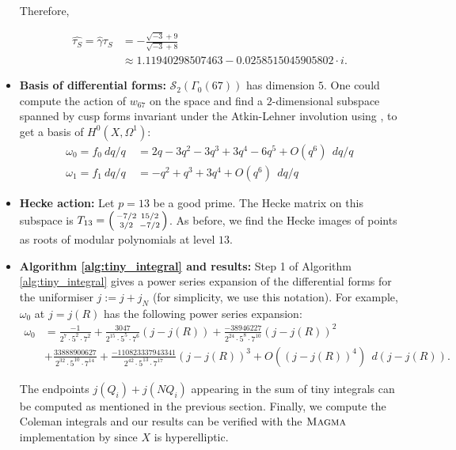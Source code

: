 \begin{itemize}
Therefore,

\begin{align*}
\hat{\tau_S} = \hat{\gamma}\tau_S &=  -\frac{\sqrt{-3} + 9}{\sqrt{-3} + 8} \\ &\approx 1.11940298507463 - 0.0258515045905802\cdot i.
\end{align*}


\item \textbf{Basis of differential forms:} $\mathcal{S}_2(\Gamma_0(67))$ has dimension $5$. One could compute the action of $w_{67}$ on the space and find a $2$-dimensional subspace spanned by cusp forms invariant under the Atkin-Lehner involution using \SageMath, to get a basis of $H^0(X,\Omega^1)$: \begin{align*} \omega_0 = f_0 \  dq/q \  &= 2q -3q^2 - 3q^3 + 3q^4 - 6q^5 + O(q^6) \ \ dq/q\\ \omega_1 = f_1 \  dq/q \ &= -q^2 + q^3 + 3q^4 + O(q^6) \ \ dq/q
\end{align*}


\item \textbf{Hecke action:} Let $p=13$ be a good prime. The Hecke matrix on this subspace is $T_{13}= \begin{psmallmatrix}
    -7/2 & 15/2 \\ 3/2 & -7/2
\end{psmallmatrix}$. As before, we find the Hecke images of points as roots of modular polynomials at level $13$.

\item \textbf{Algorithm \ref{alg:tiny_integral} and results:} Step 1 of Algorithm \ref{alg:tiny_integral} gives a power series expansion of the differential forms for the uniformiser $j := j + j_N$ (for simplicity, we use this notation). For example, $\omega_0$ at $j=j(R)$ has the following power series expansion:\begin{align*}
    \omega_0 &= \frac{-1}{2^7 \cdot 5^2 \cdot 7^2
} +  \frac{3047}{2^{15} \cdot 5^5 \cdot 7^6
}(j-j(R)) +  \frac{-38946227}{2^{24} \cdot 5^8 \cdot 7^{10}
}(j-j(R))^2 \\ &+ \frac{33888900627}{2^{32} \cdot 5^{10} \cdot 7^{14}
} + \frac{-110823337943341}{2^{42} \cdot 5^{13} \cdot 7^{17}
}(j-j(R))^3 + O((j-j(R))^4) \ \ d(j-j(R)).
\end{align*}

The endpoints $j(Q_i) + j(NQ_i)$ appearing in the sum of tiny integrals can be computed as mentioned in the previous section. Finally, we compute the Coleman integrals and our results can be verified with the $\textsc{Magma}{}$ implementation by \cite{balatuit} since $X$ is hyperelliptic. 


\end{itemize}
